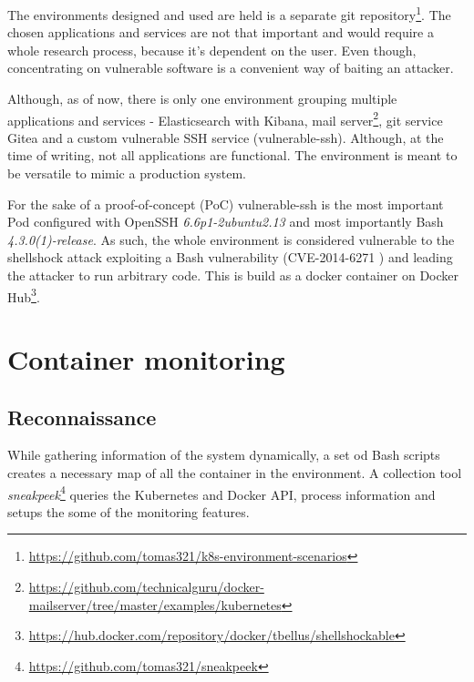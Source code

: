 The environments designed and used are held is a separate git repository\footnote{\url{https://github.com/tomas321/k8s-environment-scenarios}}. The chosen applications and services are not that important and would require a whole research process, because it's dependent on the user. Even though, concentrating on vulnerable software is a convenient way of baiting an attacker.

Although, as of now, there is only one environment grouping multiple applications and services - Elasticsearch with Kibana, mail server\footnote{\url{https://github.com/technicalguru/docker-mailserver/tree/master/examples/kubernetes}}, git service Gitea and a custom vulnerable SSH service (vulnerable-ssh). Although, at the time of writing, not all applications are functional. The environment is meant to be versatile to mimic a production system.

For the sake of a proof-of-concept (PoC) vulnerable-ssh is the most important Pod configured with OpenSSH \textit{6.6p1-2ubuntu2.13} and most importantly Bash \textit{4.3.0(1)-release}. As such, the whole environment is considered vulnerable to the shellshock attack exploiting a Bash vulnerability (CVE-2014-6271 \cite{cve:shellshock}) and leading the attacker to run arbitrary code. This is build as a docker container on Docker Hub\footnote{\url{https://hub.docker.com/repository/docker/tbellus/shellshockable}}.

\section{Container monitoring \label{implementation:mon}}


\subsection{Reconnaissance \label{implementation:mon:recon}}
While gathering information of the system dynamically, a set od Bash scripts creates a necessary map of all the container in the environment. A collection tool \textit{sneakpeek}\footnote{\url{https://github.com/tomas321/sneakpeek}} queries the Kubernetes and Docker API, process information and setups the some of the monitoring features.

